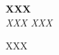 \documentclass[a4paper]{article}
\newcommand{\YourFirstName}{%
%
XXX
%
}
\newcommand{\YourLastName}{%
%
XXX
%
}
\newcommand{\YourTitle}{%
%
XXX
%
}
\newcommand{\YourAbstract}{%
%
XXX
%
}
\begin{document}
\begin{center}
	{\Large\bf \YourTitle}\hspace*{0pt}\\[3mm]
	{\large\it \YourFirstName \YourLastName}
\end{center}
\bigskip
\noindent
\YourAbstract
\end{document}
